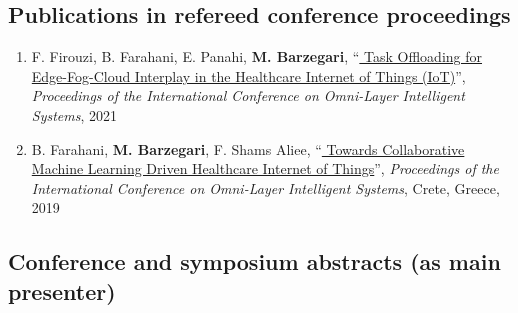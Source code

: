 \documentclass{cv}
\begin{document}
\subsection{Publications in refereed conference proceedings}
\begin{enumerate}
\item
F. Firouzi, B. Farahani, E. Panahi, \textbf{M. Barzegari}, ``\href{https://ieeexplore.ieee.org/abstract/document/9524098}{
Task Offloading for Edge-Fog-Cloud Interplay in the Healthcare Internet of Things (IoT)}'', \textit{Proceedings of the International Conference on Omni-Layer Intelligent Systems}, 2021
\item
B. Farahani, \textbf{M. Barzegari}, F. Shams Aliee, ``\href{https://dl.acm.org/citation.cfm?id=3312644}{
Towards Collaborative Machine Learning Driven Healthcare Internet of Things}'', \textit{Proceedings of the International Conference on Omni-Layer Intelligent Systems}, Crete, Greece, 2019 
\end{enumerate}

\subsection{Conference and symposium abstracts (as main presenter)}
\end{document}

